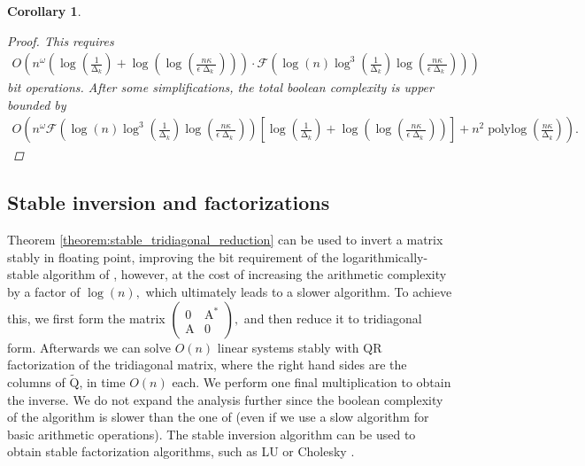 \documentclass{article}
\newcommand{\lbrac}{\left[}
\newcommand{\rbrac}{\right]}
\newcommand{\lpar}{\left(}
\newcommand{\rpar}{\right)}
\newtheorem{corollary}{Corollary}[section]
\DeclareMathOperator{\polylog}{polylog}
\DeclareMathOperator{\gap}{\Delta}
\newcommand\matA{\boldsymbol{\mathrm{A}}}
\newcommand\matQtilde{\widetilde{\boldsymbol{\mathrm{Q}}}}
\newcommand{\flopcost}{\mathcal{F}}
\begin{document}
\begin{corollary}
\begin{proof}
    This requires
    \begin{align*}
        O\lpar
            n^{\omega}\lpar
                \log(\tfrac{1}{\gap_k})+\log(\log(\tfrac{n\kappa}{\epsilon\gap_k}))
            \rpar
            \cdot
            \flopcost
            \lpar
            \log(n)
            \log^3(\tfrac{1}{\gap_k})\log(\tfrac{n\kappa}{\epsilon\gap_k})
        \rpar
        \rpar
    \end{align*} bit operations.
    After some simplifications, the total boolean complexity is upper bounded by
    \begin{align*}
        O\lpar
            n^{\omega}
            \flopcost
            \lpar
                \log(n)
                \log^3(\tfrac{1}{\gap_k})\log(\tfrac{n\kappa}{\epsilon\gap_k})
            \rpar
            \lbrac
                \log(\tfrac{1}{\gap_k})+\log(\log(\tfrac{n\kappa}{\epsilon\gap_k}))
            \rbrac
            +
            n^{2}\polylog(\tfrac{n\kappa}{\gap_k})
        \rpar.
    \end{align*}
\end{proof}
\end{corollary}


\subsection{Stable inversion and factorizations}
Theorem \ref{theorem:stable_tridiagonal_reduction} can be used to invert a matrix stably in floating point, improving the bit requirement of the logarithmically-stable algorithm of \cite{demmel2007fastla}, however, at the cost of increasing the arithmetic complexity by a factor of $\log(n),$ which ultimately leads to a slower algorithm. To achieve this, we first form the matrix $\begin{pmatrix}
    0 & \matA^* \\
    \matA & 0
\end{pmatrix},$ and then reduce it to tridiagonal form. Afterwards we can solve $O(n)$ linear systems stably with QR factorization of the tridiagonal matrix, where the right hand sides are the columns of $\matQtilde$, in time $O(n)$ each. We perform one final multiplication to obtain the inverse. We do not expand the analysis further since the boolean complexity of the algorithm is slower than the one of \cite{demmel2007fastla} (even if we use a slow algorithm for basic arithmetic operations).
The stable inversion algorithm can be used to obtain stable factorization algorithms, such as LU \cite{demmel2007fastla} or Cholesky \cite{sobczyk2024invariant}.
\end{document}
